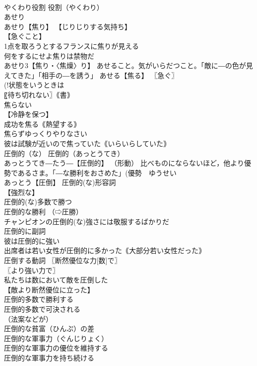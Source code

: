 \documentclass[8pt]{extreport}
\begin{document}
\begin{CJK}{UTF8}{min}
\\	やくわり役割		役割（やくわり） 
\\	あせり		
\\	あせり【焦り】 【じりじりする気持ち】
\\	【急ぐこと】
\\	1点を取ろうとするフランスに焦りが見える 
\\	何をするにせよ焦りは禁物だ 
\\	あせり3【焦り・〈焦燥〉り】 あせること。気がいらだつこと。「敵に―の色が見えてきた」「相手の―を誘う」 あせる【焦る】 〖急ぐ〗
\\	(!状態をいうときは 
\\	〖待ち切れない〗｟書｠
\\	焦らない 
\\	【冷静を保つ】
\\	成功を焦る｟熱望する｠ 
\\	焦らずゆっくりやりなさい 
\\	彼は試験が近いので焦っていた｟いらいらしていた｠ 
\\	圧倒的（な）		圧倒的（あっとうてき） 
\\	あっとうてき―たう―【圧倒的】 （形動） 比べものにならないほど，他より優勢であるさま。「―な勝利をおさめた」(優勢　ゆうせい 
\\	あっとう【圧倒】 圧倒的(な)形容詞 
\\	【強烈な】
\\	圧倒的(な)多数で勝つ 
\\	圧倒的な勝利 （⇨圧勝） 
\\	チャンピオンの圧倒的(な)強さには敬服するばかりだ 
\\	圧倒的に副詞 
\\	彼は圧倒的に強い 
\\	出席者は若い女性が圧倒的に多かった｟大部分若い女性だった｠ 
\\	圧倒する動詞 〖断然優位な力[数]で〗
\\	〖より強い力で〗
\\	私たちは数において敵を圧倒した 
\\	【敵より断然優位に立った】
\\	圧倒的多数で勝利する 
\\	圧倒的多数で可決される 
\\	（法案などが） 
\\	圧倒的な貧富（ひんぷ）の差 
\\	圧倒的な軍事力（ぐんじりょく） 
\\	圧倒的な軍事力の優位を維持する 
\\	圧倒的な軍事力を持ち続ける 

\end{CJK}
\end{document}
